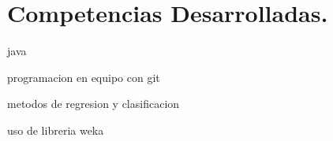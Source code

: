 \section{Competencias Desarrolladas.}

java

programacion en equipo con git

metodos de regresion y clasificacion

uso de libreria weka





